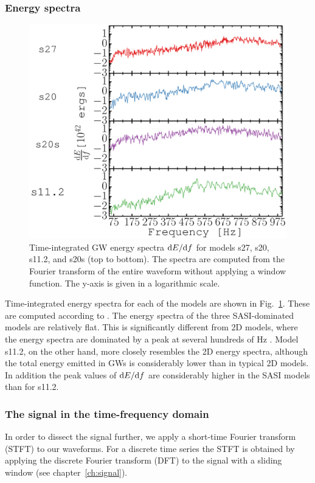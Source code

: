 \subsubsection{Energy spectra}
\begin{figure}
\centering
\includegraphics[width=0.7\linewidth]{./images/paper1/fig2.pdf}
\caption{Time-integrated GW energy spectra $\mathrm{d} E/ \mathrm{d} f$ for models s27,
s20, s11.2, and s20s (top to bottom). The spectra
are computed from the Fourier transform of the entire waveform
without applying a window function. The y-axis is given in a logarithmic scale.
\label{fig:energy_spectra}}
\end{figure}

Time-integrated energy spectra for each of the models are shown
in Fig.~\ref{fig:energy_spectra}. These are computed according to 
. 
The energy spectra of the three SASI-dominated models are relatively flat. 
This is significantly
different from 2D models, where the energy spectra
are dominated by a peak at several hundreds of $\mathrm{Hz}$
\citep{marek_08,mueller_13,yakunin_15}. Model s11.2, on the other hand, 
more closely resembles the 2D energy spectra, although
the total energy emitted in GWs is considerably lower than in typical 2D models. 
In addition the peak values of $\mathrm{d} E/\mathrm{d} f$
are considerably higher in the SASI models than for s11.2.

\subsubsection{The signal in the time-frequency domain}
In order to dissect the signal further, we apply a short-time
Fourier transform (STFT) to our waveforms. For a discrete time series
the STFT is obtained by applying the discrete Fourier transform (DFT)
to the signal with a sliding window (see chapter~\ref{ch:signal}).

